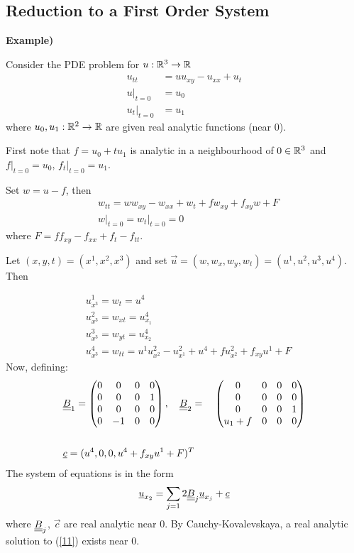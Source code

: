 \documentclass[10pt,a4paper]{report}
\newenvironment{proof}
{\begin{changemargin}{1cm}{0.5cm} 
	}%
	{\end{changemargin}
}
\begin{document}
\subsection*{Reduction to a First Order System}

\textbf{Example) }
\begin{proof}
\quad Consider the PDE problem for $u:\mathbb{R}^3 \rightarrow \mathbb{R}$
\begin{align}
u_{tt} &= uu_{xy} - u_{xx} + u_t  \label{11} \\
u\big|_{t=0}  &= u_0  \nonumber \\
u_t \big|_{t=0} &= u_1 \nonumber
\end{align}
where $u_0, u_1:\mathbb{R}^2 \rightarrow \mathbb{R}$ are given real analytic functions (near 0).

First note that $f=u_0 + tu_1$ is analytic in a neighbourhood of $0\in \mathbb{R}^3$ and $f\big|_{t=0} = u_0$, $f_t\big|_{t=0} = u_1$. 

Set $w = u-f$, then
\begin{align*}
& w_{tt} = ww_{xy}  - w_{xx} + w_t + fw_{xy} + f_{xy} w + F\\
& w\big|_{t=0} = w_t \big|_{t=0} =0
\end{align*}
where $F= ff_{xy} - f_{xx} +f_t -f_{tt}$.

Let $(x,y,t) = (x^1,x^2,x^3)$ and set $\vec{u} = (w,w_x,w_y,w_t) = (u^1,u^2,u^3,u^4)$. Then

\begin{align*}
& u^1_{x^3} = w_t = u^4 \\
& u^2_{x^3} = w_{xt} = u^4_{x_1} \\
& u^3_{x^3} = w_{yt} = u^4_{x_2} \\
& u^4_{x^3} = w_{tt} = u^1 u^2_{x^2} - u^2_{x^1}+ u^4+ fu^2_{x^2} + f_{xy}u^1 + F
\end{align*}
Now, defining:
\begin{align*}
& \underline{\underline{B}}_1 = \begin{pmatrix}
0 & 0 & 0 & 0 \\
0 & 0 & 0 & 1 \\
0 & 0 & 0 & 0 \\
0 & -1& 0 & 0
\end{pmatrix},\quad \underline{\underline{B}}_2 = \quad \begin{pmatrix}
0 & 0 & 0 & 0 \\
0 & 0 & 0 & 0 \\
0 & 0 & 0 & 1 \\
u_1 +f & 0 & 0 & 0 
\end{pmatrix} \\
& \quad \\
& \underline{c} = (u^4, 0, 0, u^4 + f_{xy}u^1 +F)^T
\end{align*}
The system of equations is in the form
\begin{align*}
\underline{u}_{x_2} = \sum_{j=1}2 \underline{\underline{B}}_j \underline{u}_{x_j} + \underline{c}
\end{align*}
where $\underline{\underline{B}}_j$, $\vec{c}$ are real analytic near 0. By Cauchy-Kovalevskaya, a real analytic solution to (\ref{11}) exists near 0.
\end{proof}
\s
\end{document}
